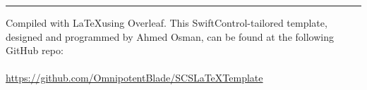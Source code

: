\documentclass[12pt]{article}
\begin{document}
 





\fancyfoot{}

\rfoot{\thepage}

\newpage
\tableofcontents
\vfill
\noindent\rule{\textwidth}{0.5pt}\vspace{0.1in}
\noindent\small{Compiled with \LaTeX\text{ }using Overleaf. This SwiftControl-tailored template, designed and programmed by Ahmed Osman, can be found at the following GitHub repo:
\\\\\href{https://github.com/OmnipotentBlade/SCSLaTeXTemplate}{https://github.com/OmnipotentBlade/SCSLaTeXTemplate}}
\newpage
{}
\end{document}
